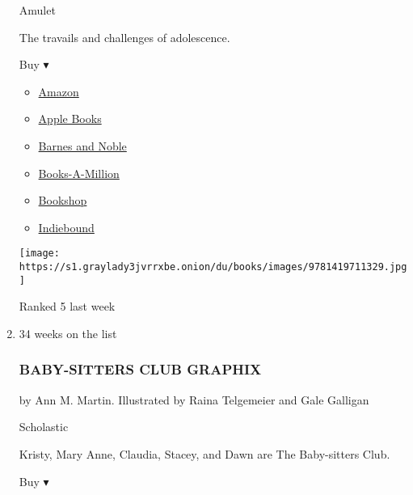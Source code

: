 \begin{enumerate}
  Amulet

  The travails and challenges of adolescence.

  Buy ▾

  \begin{itemize}
  \tightlist
  \item
    \href{http://www.amazon.com/Diary-Wimpy-Kid-Hard-Luck/dp/1419711326?tag=NYTBS-20}{Amazon}
  \item
    \href{https://du-gae-books-dot-nyt-du-prd.appspot.com/buy?title=DIARY+OF+A+WIMPY+KID\&author=Jeff+Kinney}{Apple
    Books}
  \item
    \href{https://www.anrdoezrs.net/click-7990613-11819508?url=https\%3A\%2F\%2Fwww.barnesandnoble.com\%2Fw\%2F\%3Fean\%3D9781419739033}{Barnes
    and Noble}
  \item
    \href{https://www.anrdoezrs.net/click-7990613-35140?url=https\%3A\%2F\%2Fwww.booksamillion.com\%2Fp\%2FDIARY\%2BOF\%2BA\%2BWIMPY\%2BKID\%2FJeff\%2BKinney\%2F9781419739033}{Books-A-Million}
  \item
    \href{https://bookshop.org/a/3546/9781419739033}{Bookshop}
  \item
    \href{https://www.indiebound.org/book/9781419739033?aff=NYT}{Indiebound}
  \end{itemize}

  \texttt{[image: https://s1.graylady3jvrrxbe.onion/du/books/images/9781419711329.jpg]}

  Ranked 5 last week
\item
  34 weeks on the list

  \hypertarget{baby-sitters-club-graphix}{%
  \subsubsection{BABY-SITTERS CLUB
  GRAPHIX}\label{baby-sitters-club-graphix}}

  by Ann M. Martin. Illustrated by Raina Telgemeier and Gale Galligan

  Scholastic

  Kristy, Mary Anne, Claudia, Stacey, and Dawn are The Baby-sitters
  Club.

  Buy ▾


\end{enumerate}
